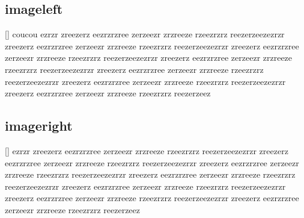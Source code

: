 \documentclass{article}
\begin{document}
\subsection{imageleft}
	[\label{fig:leftimage}]{
		coucou ezrzr zreezerz eezrzrzree zerzeezr zrzreeze rzeezrzrz reezerzeezezrzr zreezerz eezrzrzree zerzeezr zrzreeze rzeezrzrz reezerzeezezrzr zreezerz eezrzrzree zerzeezr zrzreeze rzeezrzrz reezerzeezezrzr zreezerz eezrzrzree zerzeezr zrzreeze rzeezrzrz reezerzeezezrzr zreezerz eezrzrzree zerzeezr zrzreeze rzeezrzrz reezerzeezezrzr zreezerz eezrzrzree zerzeezr zrzreeze rzeezrzrz reezerzeezezrzr zreezerz eezrzrzree zerzeezr zrzreeze rzeezrzrz reezerzeez	
	}
\pagebreak
\subsection{imageright}
	[\label{fig:rightimage}]{
		ezrzr zreezerz eezrzrzree zerzeezr zrzreeze rzeezrzrz reezerzeezezrzr zreezerz eezrzrzree zerzeezr zrzreeze rzeezrzrz reezerzeezezrzr zreezerz eezrzrzree zerzeezr zrzreeze rzeezrzrz reezerzeezezrzr zreezerz eezrzrzree zerzeezr zrzreeze rzeezrzrz reezerzeezezrzr zreezerz eezrzrzree zerzeezr zrzreeze rzeezrzrz reezerzeezezrzr zreezerz eezrzrzree zerzeezr zrzreeze rzeezrzrz reezerzeezezrzr zreezerz eezrzrzree zerzeezr zrzreeze rzeezrzrz reezerzeez	
	}
	
\end{document}
